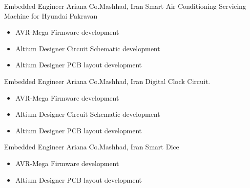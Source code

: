 	{Embedded Engineer}
	{Ariana Co.}{Mashhad, Iran}
	{
         \newline
        Smart Air Conditioning Servicing Machine for Hyundai Pakravan
        }
        {\begin{itemize}
            \item AVR-Mega Firmware development
            \item Altium Designer Circuit Schematic development
            \item Altium Designer  PCB layout development 
        \end{itemize}}


	{Embedded Engineer}
	{Ariana Co.}{Mashhad, Iran}
	{
        \newline 
        Digital Clock Circuit.
        }
        {
        \begin{itemize}
            \item AVR-Mega Firmware development
            \item Altium Designer Circuit Schematic development
            \item Altium Designer  PCB layout development 
        \end{itemize}
        }

	{Embedded Engineer}
	{Ariana Co.}{Mashhad, Iran}
	{
        \newline 
        Smart Dice
        }
        {
        \begin{itemize}
            \item AVR-Mega Firmware development
            \item Altium Designer  PCB layout development 
        \end{itemize}
        }


 
